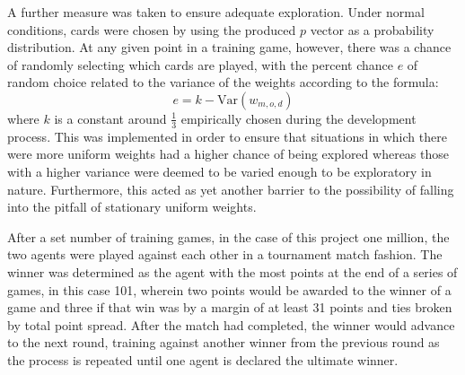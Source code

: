 \newcommand{\Var}{\mathrm{Var}}
A further measure was taken to ensure adequate exploration.
%
Under normal conditions,
cards were chosen by using the produced $p$ vector as a probability
distribution.
%
At any given point in a training game, however,
there was a chance of randomly selecting which cards are played,
with the percent chance $e$ of random choice related to the variance of the 
weights according to the formula:
\[
	e = k - \Var(w_{m,o,d})
\]
where $k$ is a constant around $\frac{1}{3}$ empirically chosen during the
development process.
%
This was implemented in order to ensure that situations in which there were
more uniform weights had a higher chance of being explored
whereas those with a higher variance were deemed to be varied enough to be
exploratory in nature.
%
Furthermore, this acted as yet another barrier to the possibility of falling
into the pitfall of stationary uniform weights.

After a set number of training games,
in the case of this project one million,
the two agents were played against each other in a tournament match fashion.
%
The winner was determined as the agent with the most points at the end
of a series of games, %
in this case 101, %
wherein two points would be awarded to the winner of a game and three if that
win was by a margin of at least 31 points
and ties broken by total point spread.
%
After the match had completed,
the winner would advance to the next round,
training against another winner from the previous round as the process is
repeated until one agent is declared the ultimate winner.

